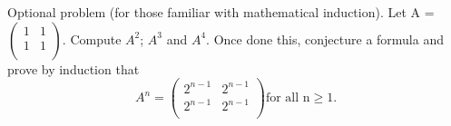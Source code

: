 \documentclass[12pt]{article}
\newenvironment{problem}[2][Problem]{\begin{trivlist}
\item[\hskip \labelsep {\bfseries #1}\hskip \labelsep {\bfseries #2.}]}{\end{trivlist}}
\begin{document}
\begin{problem}{VI}
Optional problem (for those familiar with mathematical induction). Let A =
$\left(
\begin{array}{cc}
 1 & 1 \\
 1 & 1 \\
\end{array}
\right).$
Compute $A^{2}$; $A^{3}$ and $A^{4}$. Once done this, conjecture a formula and prove by induction that
$$A^n=\left(
\begin{array}{cc}
 2^{n-1} & 2^{n-1} \\
 2^{n-1} & 2^{n-1} \\
\end{array}
\right)\text{for all n} \geq 1.$$
\end{problem}
\end{document}
